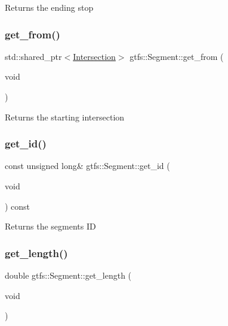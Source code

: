 \begin{DoxyReturn}{Returns}
the ending stop 
\end{DoxyReturn}
\mbox{\label{classgtfs_1_1Segment_ae43fcbd6aab7e468122f0110a2d60968}} 
\subsubsection{\texorpdfstring{get\+\_\+from()}{get\_from()}}
{\footnotesize\ttfamily std\+::shared\+\_\+ptr$<$\hyperlink{classgtfs_1_1Intersection}{Intersection}$>$ gtfs\+::\+Segment\+::get\+\_\+from (\begin{DoxyParamCaption}\item[{void}]{ }\end{DoxyParamCaption})\hspace{0.3cm}{\ttfamily [inline]}}

\begin{DoxyReturn}{Returns}
the starting intersection 
\end{DoxyReturn}
\mbox{\label{classgtfs_1_1Segment_a5c324888b7535df4623d8f32d907fca3}} 
\subsubsection{\texorpdfstring{get\+\_\+id()}{get\_id()}}
{\footnotesize\ttfamily const unsigned long\& gtfs\+::\+Segment\+::get\+\_\+id (\begin{DoxyParamCaption}\item[{void}]{ }\end{DoxyParamCaption}) const\hspace{0.3cm}{\ttfamily [inline]}}

\begin{DoxyReturn}{Returns}
the segment\textquotesingle{}s ID 
\end{DoxyReturn}
\mbox{\label{classgtfs_1_1Segment_a4f42ea597e18e54c9ec506697eb333a9}} 
\subsubsection{\texorpdfstring{get\+\_\+length()}{get\_length()}}
{\footnotesize\ttfamily double gtfs\+::\+Segment\+::get\+\_\+length (\begin{DoxyParamCaption}\item[{void}]{ }\end{DoxyParamCaption})\hspace{0.3cm}{\ttfamily [inline]}}

